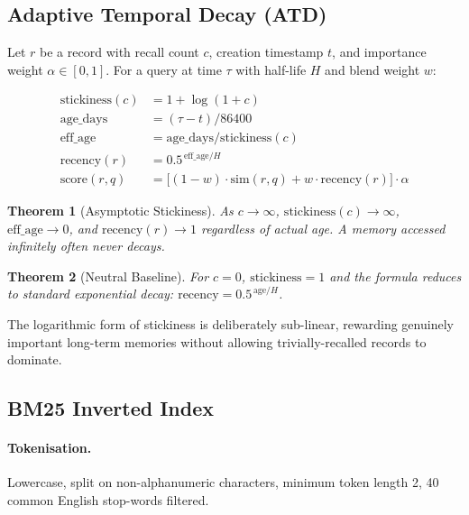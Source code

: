 \documentclass[11pt,twocolumn]{article}
\newtheorem{theorem}{Theorem}
\begin{document}
\subsection{Adaptive Temporal Decay (ATD)}
\label{sec:atd}

Let $r$ be a record with recall count $c$, creation timestamp $t$, and importance
weight $\alpha \in [0,1]$. For a query at time $\tau$ with half-life $H$ and
blend weight $w$:

\begin{align}
  \text{stickiness}(c) &= 1 + \log(1 + c)
  \label{eq:stickiness}\\
  \text{age\_days}     &= (\tau - t) / 86400\\
  \text{eff\_age}      &= \text{age\_days} / \text{stickiness}(c)\\
  \text{recency}(r)    &= 0.5^{\,\text{eff\_age} / H}
  \label{eq:recency}\\
  \text{score}(r,q)    &= \bigl[(1-w)\cdot\text{sim}(r,q) + w\cdot\text{recency}(r)\bigr]\cdot\alpha
  \label{eq:score}
\end{align}

\begin{theorem}[Asymptotic Stickiness]
As $c \to \infty$, $\text{stickiness}(c) \to \infty$, $\text{eff\_age} \to 0$,
and $\text{recency}(r) \to 1$ regardless of actual age.
A memory accessed infinitely often never decays.
\end{theorem}

\begin{theorem}[Neutral Baseline]
For $c=0$, $\text{stickiness}=1$ and the formula reduces to standard exponential
decay: $\text{recency} = 0.5^{\,\text{age}/H}$.
\end{theorem}

The logarithmic form of stickiness is deliberately sub-linear, rewarding genuinely
important long-term memories without allowing trivially-recalled records to dominate.

\subsection{BM25 Inverted Index}

\paragraph{Tokenisation.} Lowercase, split on non-alphanumeric characters,
minimum token length 2, 40 common English stop-words filtered.
\end{document}
